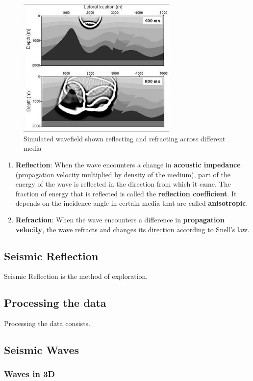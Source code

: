 \begin{figure}[ht]
	\centering
	\includegraphics[width=0.7\textwidth]{Images/reflectionrefraction.jpg}
	\caption{Simulated wavefield shown reflecting and refracting across different media}
	\label{fig:Wavefield-Reflection-And-Refraction}
\end{figure}

\begin{enumerate}
	\item
	\textbf{Reflection}: When the wave encounters a change in \textbf{acoustic impedance} (propagation velocity multiplied by density of the medium), part of the energy of the wave is reflected in the direction from which it came. The fraction of energy that is reflected is called the \textbf{reflection coefficient}. It depends on the incidence angle in certain media that are called \textbf{anisotropic}.
	\item
	\textbf{Refraction}: When the wave encounters a difference in \textbf{propagation velocity}, the wave refracts and changes its direction according to Snell's law. 
\end{enumerate}

\subsection{Seismic Reflection}

Seismic Reflection is the method of exploration. 

\subsection{Processing the data}

Processing the data consists. 

\subsection{Seismic Waves}


\subsubsection{Waves in 3D}



















